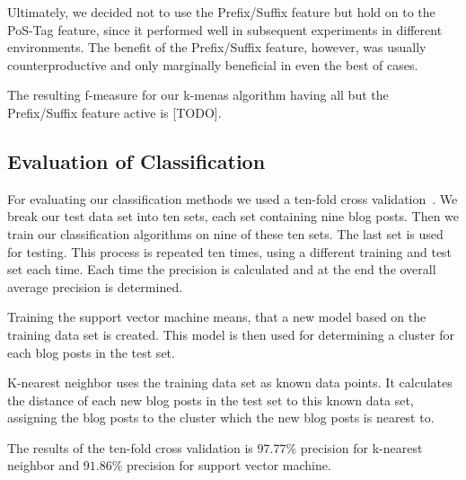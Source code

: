 Ultimately, we decided not to use the Prefix/Suffix feature but hold on to the PoS-Tag feature, since it performed well in subsequent experiments in different environments.
The benefit of the Prefix/Suffix feature, however, was usually counterproductive and only marginally beneficial in even the best of cases.


The resulting f-measure for our k-menas algorithm having all but the Prefix/Suffix feature active is [TODO].


\subsection{Evaluation of Classification}
For evaluating our classification methods we used a ten-fold cross validation~\cite{kohavi1995study}.
We break our test data set into ten sets, each set containing nine blog posts.
Then we train our classification algorithms on nine of these ten sets.
The last set is used for testing.
This process is repeated ten times, using a different training and test set each time.
Each time the precision is calculated and at the end the overall average precision is determined.


Training the support vector machine means, that a new model based on the training data set is created.
This model is then used for determining a cluster for each blog posts in the test set.


K-nearest neighbor uses the training data set as known data points.
It calculates the distance of each new blog posts in the test set to this known data set, assigning the blog posts to the cluster which the new blog posts is nearest to.


The results of the ten-fold cross validation is $97.77\%$ precision for k-nearest neighbor and $91.86\%$ precision for support vector machine.
